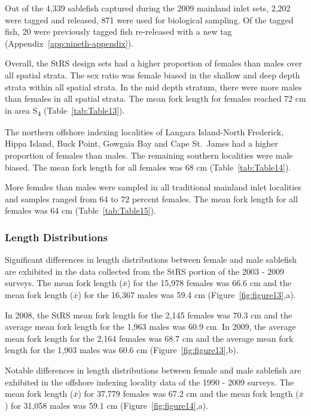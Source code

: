 \documentclass[12pt]{article}\usepackage[]{graphicx}\usepackage[]{color}
\begin{document}
Out of the 4,339 sablefish captured during the 2009 mainland inlet sets, 2,202 were tagged and released, 871 were used for biological sampling. Of the tagged fish, 20 were previously tagged fish re-released with a new tag (Appendix~\ref{app:nineth-appendix}).

Overall, the StRS design sets had a higher proportion of females than males over all spatial strata. The sex ratio was female biased in the shallow and deep depth strata within all spatial strata. In the mid depth stratum, there were more males than females in all spatial strata. The mean fork length for females reached 72 cm in area S\textsubscript{4} (Table~\ref{tab:Table13}).

The northern offshore indexing localities of Langara Island-North Frederick, Hippa Island, Buck Point, Gowgaia Bay and Cape St.~James had a higher proportion of females than males. The remaining southern localities were male biased. The mean fork length for all females was 68 cm (Table~\ref{tab:Table14}).

More females than males were sampled in all traditional mainland inlet localities and samples ranged from 64 to 72 percent females. The mean fork length for all females was 64 cm (Table~\ref{tab:Table15}).

\hypertarget{length-distributions}{%
\subsubsection{Length Distributions}\label{length-distributions}}

Significant differences in length distributions between female and male sablefish are exhibited in the data collected from the StRS portion of the 2003 - 2009 surveys. The mean fork length (\(\bar{x}\)) for the 15,978 females was 66.6 cm and the mean fork length (\(\bar{x}\)) for the 16,367 males was 59.4 cm (Figure~\ref{fig:figure13},a).

In 2008, the StRS mean fork length for the 2,145 females was 70.3 cm and the average mean fork length for the 1,963 males was 60.9 cm. In 2009, the average mean fork length for the 2,164 females was 68.7 cm and the average mean fork length for the 1,903 males was 60.6 cm (Figure~\ref{fig:figure13},b).

Notable differences in length distributions between female and male sablefish are exhibited in the offshore indexing locality data of the 1990 - 2009 surveys. The mean fork length (\(\bar{x}\)) for 37,779 females was 67.2 cm and the mean fork length (\(\bar{x}\)) for 31,058 males was 59.1 cm (Figure~\ref{fig:figure14},a).
\end{document}
